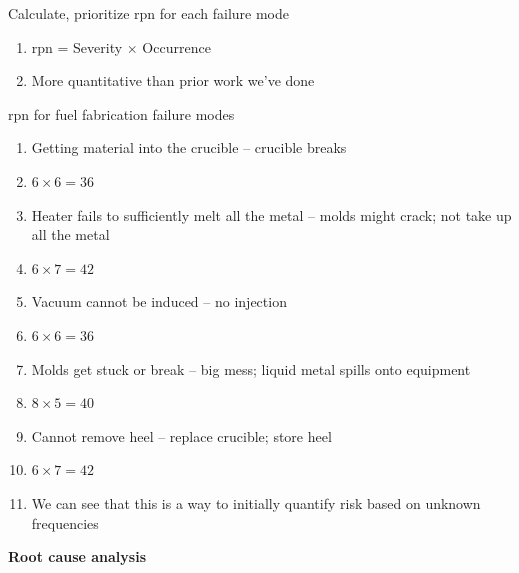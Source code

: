 \documentclass[aspectratio=1610,pdftex,dvipsnames,compress,xcolor={dvipsnames}]{beamer}
\newcommand{\acs}{\acrshort} %
\begin{document}
\addtocounter{framenumber}{-1}
\begin{frame}{Calculate, prioritize  \acs{rpn} for each failure mode}
    \begin{enumerate}[series=outerlist,topsep=0pt,itemsep=21pt,leftmargin=*,label=(\arabic*)]
        \item[]\acs{rpn} = Severity $\times$ Occurrence
        \item[]More quantitative than prior work we've done
    \end{enumerate}
\end{frame}


\begin{frame}{\acs{rpn} for fuel fabrication failure modes}
    \begin{enumerate}[series=outerlist,topsep=0pt,itemsep=3pt,leftmargin=*,label=(\arabic*)]
        \item[]Getting material into the crucible -- crucible breaks
        \item[]$6 \times 6 = 36$
            \vspace{0.10in}
        \item[]Heater fails to sufficiently melt all the metal -- molds might crack; not take up all the metal
        \item[]$6 \times 7 = 42$
            \vspace{0.10in}
        \item[]Vacuum cannot be induced -- no injection
        \item[]$6 \times 6 = 36$
            \vspace{0.10in}
        \item[]Molds get stuck or break -- big mess; liquid metal spills onto equipment
        \item[]$8 \times 5 = 40$
            \vspace{0.10in}
        \item[]Cannot remove heel -- replace crucible; store heel
        \item[]$6 \times 7 = 42$
            \vspace{0.25in}
        \item[]We can see that this is a way to initially quantify risk based on unknown frequencies
    \end{enumerate}
\end{frame}


\begin{frame}[plain]{}
    \centering\LARGE\textbf{Root cause analysis}
\end{frame}
\end{document}
